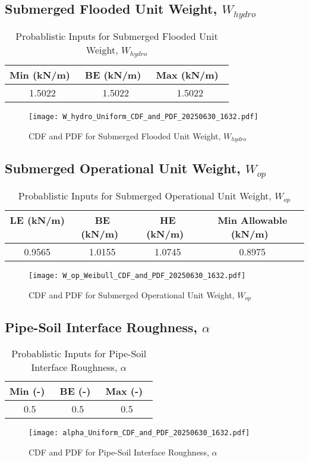 \documentclass{article}
\begin{document}
\subsection*{Submerged Flooded Unit Weight, $W_{hydro}$}
\begin{table}[h!]
\centering
\caption{Probablistic Inputs for Submerged Flooded Unit Weight, $W_{hydro}$}
\begin{tabular}{|c|c|c|}
\hline
Min (kN/m)\ & BE (kN/m)\ & Max (kN/m)\ \\
\hline
1.5022 & 1.5022 & 1.5022 \\
\hline
\end{tabular}
\end{table}
\begin{figure}[h!]
\centering
\texttt{[image: W\_hydro\_Uniform\_CDF\_and\_PDF\_20250630\_1632.pdf]}
\caption{CDF and PDF for Submerged Flooded Unit Weight, $W_{hydro}$}
\end{figure}
\clearpage
\subsection*{Submerged Operational Unit Weight, $W_{op}$}
\begin{table}[h!]
\centering
\caption{Probablistic Inputs for Submerged Operational Unit Weight, $W_{op}$}
\begin{tabular}{|c|c|c|c|}
\hline
LE (kN/m) \ & BE (kN/m)\ & HE (kN/m)\ & Min Allowable (kN/m)\ \\
\hline
0.9565 & 1.0155 & 1.0745 & 0.8975 \\
\hline
\end{tabular}
\end{table}
\begin{figure}[h!]
\centering
\texttt{[image: W\_op\_Weibull\_CDF\_and\_PDF\_20250630\_1632.pdf]}
\caption{CDF and PDF for Submerged Operational Unit Weight, $W_{op}$}
\end{figure}
\clearpage
\subsection*{Pipe-Soil Interface Roughness, $\alpha$}
\begin{table}[h!]
\centering
\caption{Probablistic Inputs for Pipe-Soil Interface Roughness, $\alpha$}
\begin{tabular}{|c|c|c|}
\hline
Min (-)\ & BE (-)\ & Max (-)\ \\
\hline
0.5 & 0.5 & 0.5 \\
\hline
\end{tabular}
\end{table}
\begin{figure}[h!]
\centering
\texttt{[image: alpha\_Uniform\_CDF\_and\_PDF\_20250630\_1632.pdf]}
\caption{CDF and PDF for Pipe-Soil Interface Roughness, $\alpha$}
\end{figure}
\clearpage
\end{document}
